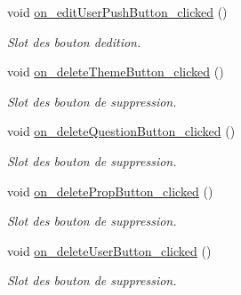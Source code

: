 \begin{DoxyCompactItemize}
void \mbox{\hyperlink{classManageWindow_a4904b87aefc385fe5343f93fde153a2a}{on\+\_\+edit\+User\+Push\+Button\+\_\+clicked}} ()
\begin{DoxyCompactList}\small\item\em Slot des bouton d\textquotesingle{}edition. \end{DoxyCompactList}\item 
void \mbox{\hyperlink{classManageWindow_a89f9fbc2426fb7c3afb890ef446c2161}{on\+\_\+delete\+Theme\+Button\+\_\+clicked}} ()
\begin{DoxyCompactList}\small\item\em Slot des bouton de suppression. \end{DoxyCompactList}\item 
void \mbox{\hyperlink{classManageWindow_a9eba7473d0b4bacf9767629537672778}{on\+\_\+delete\+Question\+Button\+\_\+clicked}} ()
\begin{DoxyCompactList}\small\item\em Slot des bouton de suppression. \end{DoxyCompactList}\item 
void \mbox{\hyperlink{classManageWindow_ac191196301dfcbb30d995790a7e5e496}{on\+\_\+delete\+Prop\+Button\+\_\+clicked}} ()
\begin{DoxyCompactList}\small\item\em Slot des bouton de suppression. \end{DoxyCompactList}\item 
void \mbox{\hyperlink{classManageWindow_a23bbad3a8c73d95e2f8f27df6458d2ea}{on\+\_\+delete\+User\+Button\+\_\+clicked}} ()
\begin{DoxyCompactList}\small\item\em Slot des bouton de suppression. \end{DoxyCompactList}\end{DoxyCompactItemize}
